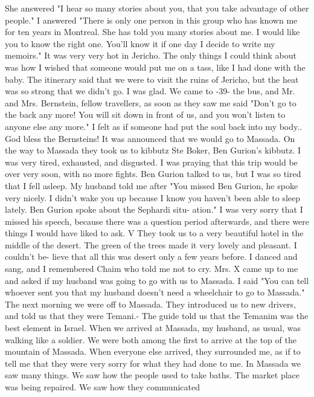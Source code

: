 She answered "I hear so many stories about you, that you take advantage of other people."
I answered "There is only one person in this group who has known me for ten years in Montreal.
She has told you many stories about me.
I would like you to know 
the right one.
You'll know it if one day I decide to write my memoirs."
It was very very hot in Jericho.
The only things I could think about 
was how I wished that someone would put me on a tass, like I had done with the baby.
The itinerary said that we were to visit the ruins of Jericho, but the heat was so strong that we didn't  go.
I was glad.
We came to 
-39- 
the bus, and Mr.
and Mrs.
Bernstein, fellow travellers, as soon as 
they saw me said "Don't go to the back any more!
You will sit down in 
front of us, and you won't listen to anyone else any more."
I felt as if 
someone had put the soul back into my body.. God bless the Bernsteins!
It was announced that we would go to Massada.
On the way to Massada 
they took us to kibbutz Ste Boker, Ben Gurion's kibbutz.
I was very tired, 
exhausted, and disgusted.
I was praying that this trip would be over 
very soon, with no more fights.
Ben Gurion talked to us, but I was so 
tired that I fell asleep.
My husband told me after "You missed Ben Gurion, 
he spoke very nicely.
I didn't wake you up because I know you haven't 
been able to sleep lately.
Ben Gurion spoke about the Sephardi situ-
ation."
I was very sorry that I missed his speech, because there was a 
question period afterwards, and there were things I would have liked to 
ask.
V
They took us to a very beautiful hotel in the middle of the desert.
The green of the trees made it very lovely and pleasant.
I couldn't be-
lieve that all this was desert only a few years before.
I danced and sang, 
and I remembered Chaim who told me not to cry.
Mrs.
X came up to me and 
asked if my husband was going to go with us to Massada.
I said "You can 
tell whoever sent you that my husband doesn't need a wheelchair to go 
to Massada."
The next morning we were off to Massada.
They introduced us to new 
drivers, and told us that they were Temani.- The guide told us that the 
Temanim was the best element in Israel.
When we arrived at Massada, my 
husband, as usual, was walking like a soldier.
We were both among the 
first to arrive at the top of the mountain of Massada.
When everyone else 
arrived, they surrounded me, as if to tell me that they were very sorry 
for what they had done to me.
In Massada we saw many things.
We saw how the people used to take 
baths.
The market place was being repaired.
We saw how they communicated 
